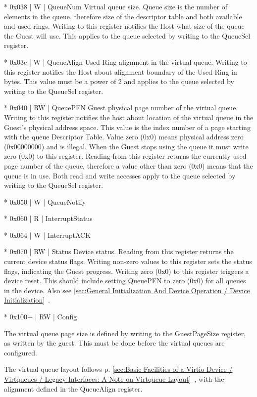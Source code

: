* 0x038 | W | QueueNum
  Virtual queue size.
  Queue size is the number of elements in the queue, therefore size
  of the descriptor table and both available and used rings.
  Writing to this register notifies the Host what size of the
  queue the Guest will use. This applies to the queue selected by
  writing to the QueueSel register.

* 0x03c | W | QueueAlign
  Used Ring alignment in the virtual queue.
  Writing to this register notifies the Host about alignment
  boundary of the Used Ring in bytes. This value must be a power
  of 2 and applies to the queue selected by writing to the QueueSel
  register.

* 0x040 | RW | QueuePFN
  Guest physical page number of the virtual queue.
  Writing to this register notifies the host about location of the
  virtual queue in the Guest's physical address space. This value
  is the index number of a page starting with the queue
  Descriptor Table. Value zero (0x0) means physical address zero
  (0x00000000) and is illegal. When the Guest stops using the
  queue it must write zero (0x0) to this register.
  Reading from this register returns the currently used page
  number of the queue, therefore a value other than zero (0x0)
  means that the queue is in use.
  Both read and write accesses apply to the queue selected by
  writing to the QueueSel register.

* 0x050 | W | QueueNotify

* 0x060 | R | InterruptStatus

* 0x064 | W | InterruptACK

* 0x070 | RW | Status
  Device status.
  Reading from this register returns the current device status
  flags.
  Writing non-zero values to this register sets the status flags,
  indicating the Guest progress. Writing zero (0x0) to this
  register triggers a device reset. This should include
  setting QueuePFN to zero (0x0) for all queues in the device.
  Also see \ref{sec:General Initialization And Device Operation / Device Initialization}~.

* 0x100+ | RW | Config

The virtual queue page size is defined by writing to the GuestPageSize
register, as written by the guest. This must be done before the
virtual queues are configured.

The virtual queue layout follows
p. \ref{sec:Basic Facilities of a Virtio Device / Virtqueues / Legacy Interfaces: A Note on Virtqueue Layout}~,
with the alignment defined in the QueueAlign register.

